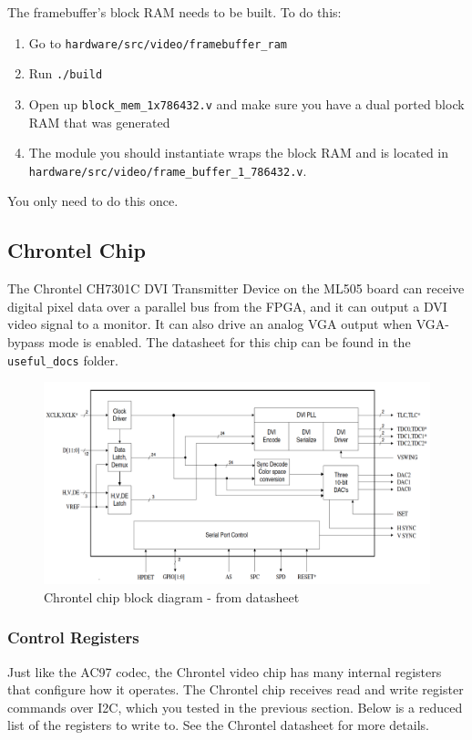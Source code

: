 \documentclass[11pt]{article}
\begin{document}
The framebuffer's block RAM needs to be built. To do this:
\begin{enumerate}
	\item Go to \verb|hardware/src/video/framebuffer_ram|
	\item Run \verb|./build|
	\item Open up \verb|block_mem_1x786432.v| and make sure you have a dual ported block RAM that was generated
	\item The module you should instantiate wraps the block RAM and is located in\\ \verb|hardware/src/video/frame_buffer_1_786432.v|.
\end{enumerate}

You only need to do this once.

\subsection{Chrontel Chip}
The Chrontel CH7301C DVI Transmitter Device on the ML505 board can receive digital pixel data over a parallel bus from the FPGA, and it can output a DVI video signal to a monitor. It can also drive an analog VGA output when VGA-bypass mode is enabled. The datasheet for this chip can be found in the \verb|useful_docs| folder.

\begin{figure}[H]
\begin{center}
	\includegraphics[width=6.5in]{dvi_block}
	\caption{Chrontel chip block diagram - from datasheet}
	\label{fig:dvi_block}
\end{center}
\end{figure}

\subsubsection{Control Registers}
Just like the AC97 codec, the Chrontel video chip has many internal registers that configure how it operates. The Chrontel chip receives read and write register commands over I2C, which you tested in the previous section. Below is a reduced list of the registers to write to. See the Chrontel datasheet for more details.
\end{document}
